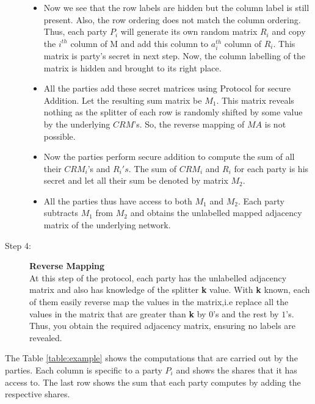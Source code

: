 \documentclass{llncs}
\begin{document}
\begin{description}
\begin{itemize}
\item Now we see that the row labels are hidden but the column label is still present. Also, the row ordering does not match the column ordering. Thus, each party $P_i$ will generate its own random matrix $R_i$ and copy the $i^{th}$ column of M and add this column to $a_i^{th}$ column of $R_i$. This matrix is party’s secret in next step. Now, the column labelling of the  matrix is hidden and brought to its right place. 

\item All the parties add these secret matrices using Protocol for secure Addition. Let the resulting sum matrix be $M_1$. This matrix reveals nothing as the splitter of each row is randomly shifted by some value by the underlying $CRM$'s. So, the reverse mapping of $MA$ is not possible.

\item Now the parties perform secure addition to compute the sum of all their $CRM_i$'s and $R_i's$. The sum of $CRM_i$ and $R_i$ for each party is his secret and let all their sum be denoted by matrix $M_2$.

\item All the parties thus have access to both $M_1$ and $M_2$. Each party subtracts $M_1$ from $M_2$ and obtains the unlabelled mapped adjacency matrix of the underlying network.

\end{itemize}
\item[Step 4:]\hspace{2mm} \textbf{Reverse Mapping}\\
At this step of the protocol, each party has the unlabelled adjacency matrix and also has knowledge of the splitter \textbf{k} value. With \textbf{k} known, each of them easily reverse map the values in the matrix,i.e replace all the values in the matrix that are greater than \textbf{k} by $0$'s and the rest by $1$'s. Thus, you obtain the required adjacency matrix, ensuring no labels are revealed. \\
\end{description}
The Table \ref{table:example} shows the computations that are carried out by the parties. Each column is specific to a party $P_i$ and shows the shares that it has access to. The last row shows the sum that each party computes by adding the respective shares.  





\end{document}
